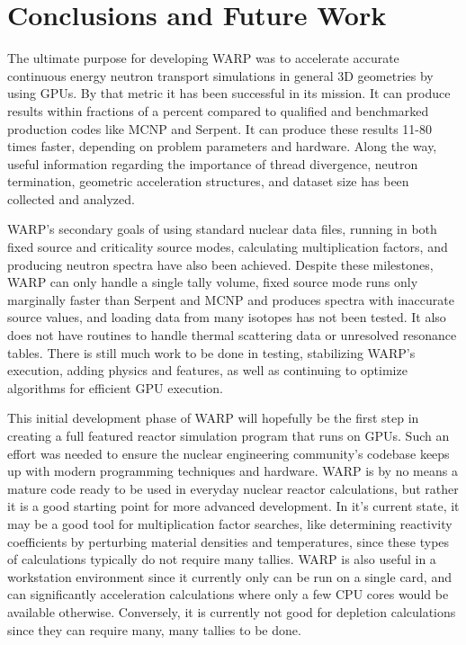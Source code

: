 \chapter{Conclusions and Future Work}
\label{chap:conclusions}

The ultimate purpose for developing WARP was to accelerate accurate continuous energy neutron transport simulations in general 3D geometries by using GPUs.  By that metric it has been successful in its mission.  It can produce results within fractions of a percent compared to qualified and benchmarked production codes like MCNP and Serpent.  It can produce these results 11-80 times faster, depending on problem parameters and hardware.  Along the way, useful information regarding the importance of thread divergence, neutron termination, geometric acceleration structures, and dataset size has been collected and analyzed.

WARP's secondary goals of using standard nuclear data files, running in both fixed source and criticality source modes, calculating multiplication factors, and producing neutron spectra have also been achieved.  Despite these milestones, WARP can only handle a single tally volume, fixed source mode runs only marginally faster than Serpent and MCNP and produces spectra with inaccurate source values, and loading data from many isotopes has not been tested.  It also does not have routines to handle thermal scattering data or unresolved resonance tables. There is still much work to be done in testing, stabilizing WARP's execution, adding physics and features, as well as continuing to optimize algorithms for efficient GPU execution.

This initial development phase of WARP will hopefully be the first step in creating a full featured reactor simulation program that runs on GPUs.  Such an effort was needed to ensure the nuclear engineering community's codebase keeps up with modern programming techniques and hardware.  WARP is by no means a mature code ready to be used in everyday nuclear reactor calculations, but rather it is a good starting point for more advanced development.  In it's current state, it may be a good tool for multiplication factor searches, like determining reactivity coefficients by perturbing material densities and temperatures, since these types of calculations typically do not require many tallies.  WARP is also useful in a workstation environment since it currently only can be run on a single card, and can significantly acceleration calculations where only a few CPU cores would be available otherwise.  Conversely, it is currently not good for depletion calculations since they can require many, many tallies to be done.  

